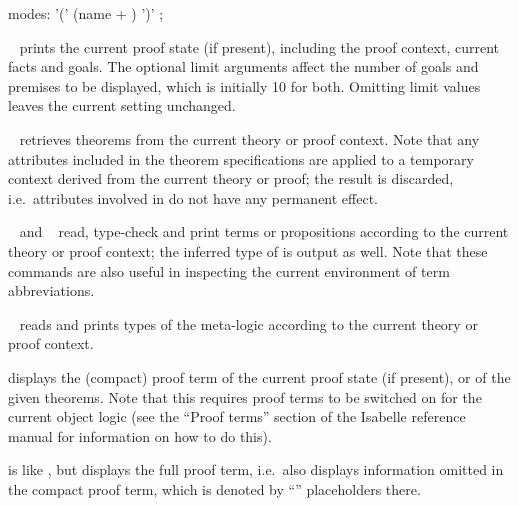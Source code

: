 \begin{isabellebody}
\begin{isamarkuptext}
\begin{rail}
    modes: '(' (name + ) ')'
    ;
  \end{rail}

  \begin{descr}

  \item [\mbox{\isa{\isacommand{pr}}}~\isa{{\isachardoublequote}goals{\isacharcomma}\ prems{\isachardoublequote}}] prints the current
  proof state (if present), including the proof context, current facts
  and goals.  The optional limit arguments affect the number of goals
  and premises to be displayed, which is initially 10 for both.
  Omitting limit values leaves the current setting unchanged.

  \item [\mbox{\isa{\isacommand{thm}}}~\isa{{\isachardoublequote}a\isactrlsub {\isadigit{1}}\ {\isasymdots}\ a\isactrlsub n{\isachardoublequote}}] retrieves
  theorems from the current theory or proof context.  Note that any
  attributes included in the theorem specifications are applied to a
  temporary context derived from the current theory or proof; the
  result is discarded, i.e.\ attributes involved in  do not have any permanent effect.

  \item [\mbox{\isa{\isacommand{term}}}~\isa{t} and \mbox{\isa{\isacommand{prop}}}~\isa{{\isasymphi}}]
  read, type-check and print terms or propositions according to the
  current theory or proof context; the inferred type of  is
  output as well.  Note that these commands are also useful in
  inspecting the current environment of term abbreviations.

  \item [\mbox{\isa{\isacommand{typ}}}~\isa{{\isasymtau}}] reads and prints types of the
  meta-logic according to the current theory or proof context.

  \item [\mbox{\isa{\isacommand{prf}}}] displays the (compact) proof term of the
  current proof state (if present), or of the given theorems. Note
  that this requires proof terms to be switched on for the current
  object logic (see the ``Proof terms'' section of the Isabelle
  reference manual for information on how to do this).

  \item [\mbox{\isa{\isacommand{full{\isacharunderscore}prf}}}] is like \mbox{}, but displays
  the full proof term, i.e.\ also displays information omitted in the
  compact proof term, which is denoted by ``\isa{{\isacharunderscore}}'' placeholders
  there.


\end{descr}
\end{isamarkuptext}
\end{isabellebody}
